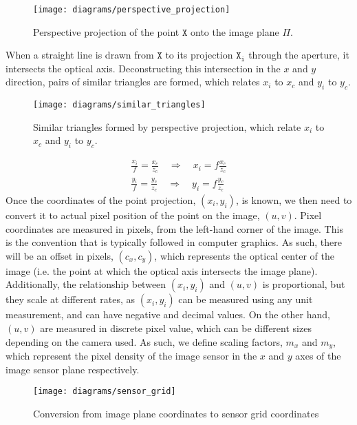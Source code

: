 \begin{figure}[H]
    \centering
    \texttt{[image: diagrams/perspective\_projection]}
    \caption{Perspective projection of the point $\mathtt{X}$ onto the image plane $\Pi$.}
\end{figure}
When a straight line is drawn from $\mathtt{X}$ to its projection $\mathtt{X_i}$ through the aperture, it intersects the optical axis. Deconstructing this intersection in the $x$ and $y$ direction, pairs of similar triangles are formed, which relates $x_i$ to $x_c$ and $y_i$ to $y_c$.
\begin{figure}[H]
    \centering
    \texttt{[image: diagrams/similar\_triangles]}
    \caption{Similar triangles formed by perspective projection, which relate $x_i$ to $x_c$ and $y_i$ to $y_c$.} \label{fig:similar_triangles}
\end{figure}
\begin{subequations}
    \begin{gather}
        \frac{x_i}{f} = \frac{x_c}{z_c} \quad \Longrightarrow \quad x_i = f \frac{x_c}{z_c} \label{subeq:xi_result}\\
        \frac{y_i}{f} = \frac{y_c}{z_c} \quad \Longrightarrow \quad y_i = f \frac{y_c}{z_c} \label{subeq:yi_result}
    \end{gather}
\end{subequations}
Once the coordinates of the point projection, $(x_i, y_i)$, is known, we then need to convert it to actual pixel position of the point on the image, $(u, v)$. Pixel coordinates are measured in pixels, from the left-hand corner of the image. This is the convention that is typically followed in computer graphics. As such, there will be an offset in pixels, $(c_x, c_y)$, which represents the optical center of the image (i.e. the point at which the optical axis intersects the image plane). Additionally, the relationship between $(x_i, y_i)$ and $(u, v)$ is proportional, but they scale at different rates, as $(x_i, y_i)$ can be measured using any unit measurement, and can have negative and decimal values. On the other hand, $(u,v)$ are measured in discrete pixel value, which can be different sizes depending on the camera used. As such, we define scaling factors, $m_x$ and $m_y$, which represent the pixel density of the image sensor in the $x$ and $y$ axes of the image sensor plane respectively.
\begin{figure}[H]
    \centering
    \texttt{[image: diagrams/sensor\_grid]}
    \caption{Conversion from image plane coordinates to sensor grid coordinates}
\end{figure}
